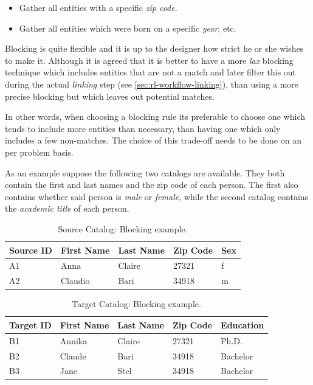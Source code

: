 \documentclass[epsfig,a4paper,11pt,titlepage,twoside,openany]{book}
\begin{document}
\begin{itemize}
    \item Gather all entities with a specific \textit{zip code}. 
    \item Gather all entities which were born on a specific \textit{year}; etc.
\end{itemize}

Blocking is quite flexible and it is up to the designer how strict he or she wishes to make it.
Although it is agreed
\cite{christen12_survey_index_techn_scalab_recor_linkag_dedup} that it is better
to have a more \textit{lax} blocking technique which includes entities that are
not a match and later filter this out during the actual \textit{linking} step
(see \autoref{sec:rl-workflow-linking}), than using a more precise blocking but
which leaves out potential matches. 

In other words, when choosing a blocking rule its preferable to choose one which tends to include more entities than necessary, than having one which only includes a few non-matches. The choice of this trade-off needs to be done on an per problem basis.

As an example suppose the following two catalogs are available. They both contain the
first and last names and the zip code of each person. The first also contains
whether said person is \textit{male} or \textit{female}, while the second catalog
contains the \textit{academic title} of each person.

\begin{table}[H]
  \centering
  \begin{tabular}{l|l|l|l|l}
    Source ID & First Name & Last Name & Zip Code & Sex \\ \hline
    A1        & Anna       & Claire    & 27321    & f   \\
    A2        & Claudio    & Bari      & 34918    & m  
  \end{tabular}
  \caption{Source Catalog: Blocking example.}
  \label{tab:blocking-ex-source}
\end{table}

\begin{table}[H]
  \centering
  \begin{tabular}{l|l|l|l|l}
    Target ID & First Name & Last Name & Zip Code & Education \\ \hline
    B1        & Annika     & Claire    & 27321    & Ph.D.     \\
    B2        & Claude     & Bari      & 34918    & Bachelor  \\
    B3        & Jane       & Stel      & 34918    & Bachelor 
  \end{tabular}
  \caption{Target Catalog: Blocking example.}
  \label{tab:blocking-ex-target}
\end{table}
\end{document}
